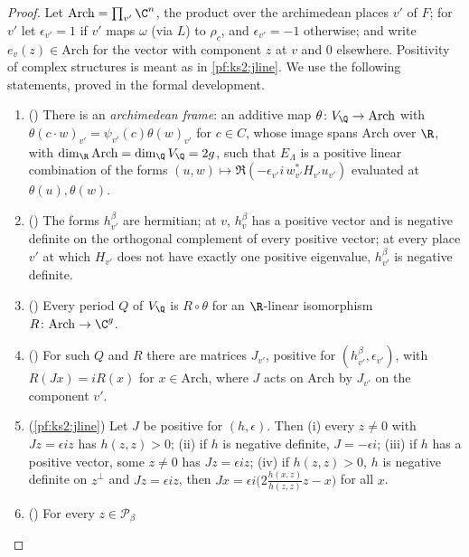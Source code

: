 \begin{proof}
Let $\mathrm{Arch}=\prod_{v'}\C^n$, the product over the archimedean places $v'$ of $F$; for $v'$ let
$\epsilon_{v'}=1$ if $v'$ maps $\omega$ (via $L$) to $\rho_c$, and $\epsilon_{v'}=-1$ otherwise; and
write $e_v(z)\in\mathrm{Arch}$ for the vector with component $z$ at $v$ and $0$ elsewhere. Positivity
of complex structures is meant as in \cref{pf:ks2:jline}. We use the following
statements, proved in the formal development.
\begin{enumerate}[label=(R\arabic*)]
\item\label{pf:ks2:R:arch} () There is an \emph{archimedean
  frame}: an additive map $\theta\colon V_\Q\to\mathrm{Arch}$ with $\theta(c\cdot
  w)_{v'}=\psi_{v'}(c)\theta(w)_{v'}$ for $c\in C$, whose image spans $\mathrm{Arch}$ over $\R$, with
  $\dim_\R\mathrm{Arch}=\dim_\Q V_\Q=2g$, such that $E_\Lambda$ is a positive linear combination of the
  forms $(u,w)\mapsto\Re(-\epsilon_{v'}i\,w_{v'}^*H_{v'}u_{v'})$ evaluated at $\theta(u),\theta(w)$.
\item\label{pf:ks2:R:sig} () The forms $h^\beta_{v'}$ are
  hermitian; at $v$, $h^\beta_v$ has a positive vector and is negative definite on the orthogonal
  complement of every positive vector; at every place $v'$ at which $H_{v'}$ does not have exactly one
  positive eigenvalue, $h^\beta_{v'}$ is negative definite.
\item\label{pf:ks2:R:ext} () Every period $Q$ of $V_\Q$ is
  $R\circ\theta$ for an $\R$-linear isomorphism $R\colon\mathrm{Arch}\to\C^g$.
\item\label{pf:ks2:R:J} () For such $Q$ and $R$ there are
  matrices $J_{v'}$, positive for $(h^\beta_{v'},\epsilon_{v'})$, with $R(Jx)=iR(x)$ for
  $x\in\mathrm{Arch}$, where $J$ acts on $\mathrm{Arch}$ by $J_{v'}$ on the component $v'$.
\item\label{pf:ks2:R:line} (\cref{pf:ks2:jline}) Let $J$ be positive for $(h,\epsilon)$. Then (i) every
  $z\ne0$ with $Jz=\epsilon iz$ has $h(z,z)>0$; (ii) if $h$ is negative definite, $J=-\epsilon i$; (iii)
  if $h$ has a positive vector, some $z\ne0$ has $Jz=\epsilon iz$; (iv) if $h(z,z)>0$, $h$ is negative
  definite on $z^\perp$ and $Jz=\epsilon iz$, then $Jx=\epsilon i\bigl(2\frac{h(x,z)}{h(z,z)}z-x\bigr)$
  for all $x$.
\item\label{pf:ks2:R:per} () For every $z\in\mathcal P_\beta$

\end{enumerate}
\end{proof}

